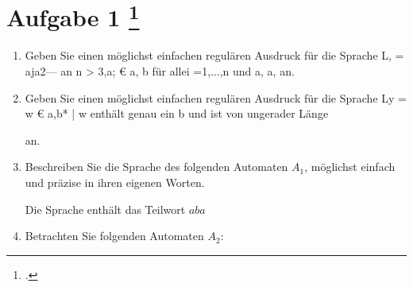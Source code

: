 \documentclass{lehramt-informatik-aufgabe}
\begin{document}
\def\Z#1#2{$q_#1z_#2$}
\def\q#1{$q_#1$}
\def\z#1{$z_#1$}

\section{Aufgabe 1
\footcite{66115:2016:03}}

\begin{enumerate}


\item Geben Sie einen möglichst einfachen regulären Ausdruck für die
Sprache L, = aja2--- an n > 3,a; € {a, b} für allei =1,...,n und a,
a, an.


\item Geben Sie einen möglichst einfachen regulären Ausdruck für die
Sprache Ly = {w € {a,b}* | w enthält genau ein b und ist von ungerader
Länge}

an.


\item Beschreiben Sie die Sprache des folgenden Automaten $A_1$,
möglichst einfach und präzise in ihren eigenen Worten.

\begin{center}
\end{center}

\begin{liAntwort}
Die Sprache enthält das Teilwort $aba$
\end{liAntwort}


\item Betrachten Sie folgenden Automaten $A_2$:


\end{enumerate}
\end{document}
